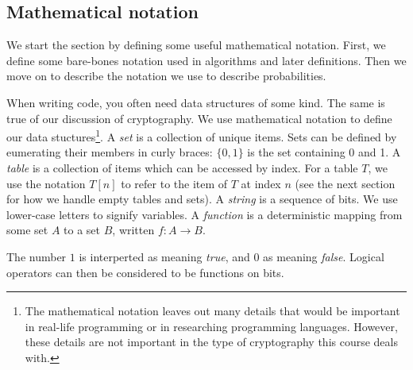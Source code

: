 \subsection{Mathematical notation}\label{ssec:math-notation}
We start the section by defining some useful mathematical notation. First, we define some bare-bones notation used in algorithms and later definitions. Then we move on to describe the notation we use to describe probabilities.

When writing code, you often need data structures of some kind. The same is true of our discussion of cryptography. We use mathematical notation to define our data stuctures\footnote{The mathematical notation leaves out many details that would be important in real-life programming or in researching programming languages. However, these details are not important in the type of cryptography this course deals with.}. A \emph{set} is a collection of unique items. Sets can be defined by eumerating their members in curly braces: $\{0,1\}$ is the set containing 0 and 1. A \emph{table} is a collection of items which can be accessed by index. For a table $T$, we use the notation $T[n]$ to refer to the item of $T$ at index $n$ (see the next section for how we handle empty tables and sets). A \emph{string} is a sequence of bits. We use lower-case letters to signify variables. A \emph{function} is a deterministic mapping from some set $A$ to a set $B$, written $f: A \rightarrow B$.

The number $1$ is interperted as meaning \emph{true}, and $0$ as meaning \emph{false}. Logical operators can then be considered to be functions on bits.

